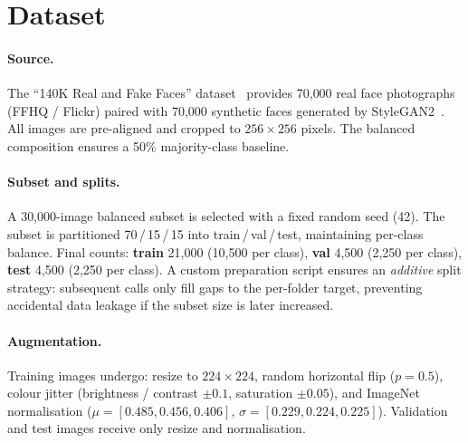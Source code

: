 \section{Dataset}
\label{sec:dataset}

\paragraph{Source.}
The ``140K Real and Fake Faces'' dataset~\cite{dataset140k} provides 70{,}000
real face photographs (FFHQ / Flickr) paired with 70{,}000 synthetic faces
generated by StyleGAN2~\cite{karras2020stylegan2}.
All images are pre-aligned and cropped to $256\!\times\!256$ pixels.
The balanced composition ensures a 50\% majority-class baseline.

\paragraph{Subset and splits.}
A 30{,}000-image balanced subset is selected with a fixed random seed (42).
The subset is partitioned 70\,/\,15\,/\,15 into train\,/\,val\,/\,test,
maintaining per-class balance.
Final counts: \textbf{train} 21{,}000 (10{,}500 per class),
\textbf{val} 4{,}500 (2{,}250 per class),
\textbf{test} 4{,}500 (2{,}250 per class).
A custom preparation script ensures an \emph{additive} split strategy:
subsequent calls only fill gaps to the per-folder target, preventing
accidental data leakage if the subset size is later increased.

\paragraph{Augmentation.}
Training images undergo: resize to $224\!\times\!224$, random horizontal
flip ($p\!=\!0.5$), colour jitter (brightness / contrast $\pm 0.1$,
saturation $\pm 0.05$), and ImageNet normalisation
($\mu\!=\![0.485,0.456,0.406]$, $\sigma\!=\![0.229,0.224,0.225]$).
Validation and test images receive only resize and normalisation.
